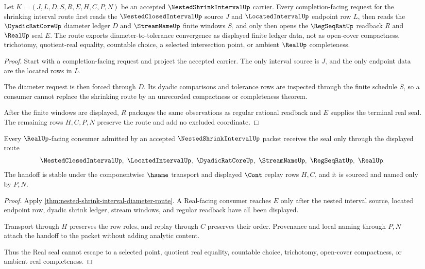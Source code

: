 \begin{theorem}
\label{thm:nested-shrink-interval-diameter-route}
Let $K=(J,L,D,S,R,E,H,C,P,N)$ be an accepted $\NestedShrinkIntervalUp$ carrier. Every completion-facing request for the shrinking interval route first reads the $\NestedClosedIntervalUp$ source $J$ and $\LocatedIntervalUp$ endpoint row $L$, then reads the $\DyadicRatCoreUp$ diameter ledger $D$ and $\StreamNameUp$ finite windows $S$, and only then opens the $\RegSeqRatUp$ readback $R$ and $\RealUp$ seal $E$. The route exports diameter-to-tolerance convergence as displayed finite ledger data, not as open-cover compactness, trichotomy, quotient-real equality, countable choice, a selected intersection point, or ambient $\RealUp$ completeness.
\end{theorem}
\begin{proof}
Start with a completion-facing request and project the accepted carrier. The only interval source is $J$, and the only endpoint data are the located rows in $L$.

The diameter request is then forced through $D$. Its dyadic comparisons and tolerance rows are inspected through the finite schedule $S$, so a consumer cannot replace the shrinking route by an unrecorded compactness or completeness theorem.

After the finite windows are displayed, $R$ packages the same observations as regular rational readback and $E$ supplies the terminal real seal. The remaining rows $H,C,P,N$ preserve the route and add no excluded coordinate.
\end{proof}

\begin{theorem}
\label{thm:nested-shrink-interval-real-seal-handoff}
Every $\RealUp$-facing consumer admitted by an accepted $\NestedShrinkIntervalUp$ packet receives the seal only through the displayed route
$$
\NestedClosedIntervalUp,\ \LocatedIntervalUp,\ \DyadicRatCoreUp,\ \StreamNameUp,\ \RegSeqRatUp,\ \RealUp .
$$
The handoff is stable under the componentwise $\hsame$ transport and displayed $\Cont$ replay rows $H,C$, and it is sourced and named only by $P,N$.
\end{theorem}
\begin{proof}
Apply \autoref{thm:nested-shrink-interval-diameter-route}. A Real-facing consumer reaches $E$ only after the nested interval source, located endpoint row, dyadic shrink ledger, stream windows, and regular readback have all been displayed.

Transport through $H$ preserves the row roles, and replay through $C$ preserves their order. Provenance and local naming through $P,N$ attach the handoff to the packet without adding analytic content.

Thus the Real seal cannot escape to a selected point, quotient real equality, countable choice, trichotomy, open-cover compactness, or ambient real completeness.
\end{proof}

